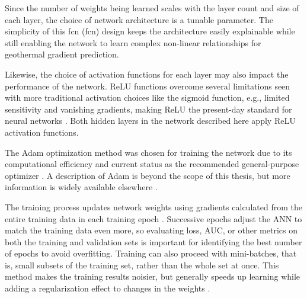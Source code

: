 Since the number of weights being learned scales with the layer count and size of each layer, the choice of network architecture is a tunable parameter. The simplicity of this \acrlong{fcn} (\acrshort{fcn}) design keeps the architecture easily explainable while still enabling the network to learn complex non-linear relationships for geothermal gradient prediction.

Likewise, the choice of activation functions for each layer may also impact the performance of the network. ReLU functions overcome several limitations seen with more traditional activation choices like the sigmoid function, e.g., limited sensitivity and vanishing gradients, making ReLU the present-day standard for neural networks \citep{brownlee_gentle_2019}. Both hidden layers in the network described here apply ReLU activation functions.

The Adam optimization method was chosen for training the network due to its computational efficiency and current status as the recommended general-purpose optimizer \citep{brownlee_gentle_2017}. A description of Adam is beyond the scope of this thesis, but more information is widely available elsewhere \citep[e.g.,\ ][]{kingma_adam_2017}.

The training process updates network weights using gradients calculated from the entire training data in each training epoch \citep[p.\ 397]{hastie_elements_2009}. Successive epochs adjust the ANN to match the training data even more, so evaluating loss, AUC, or other metrics on both the training and validation sets is important for identifying the best number of epochs to avoid overfitting. Training can also proceed with mini-batches, that is, small subsets of the training set, rather than the whole set at once. This method makes the training results noisier, but generally speeds up learning while adding a regularization effect to changes in the weights \citep{brownlee_how_2019}.  

